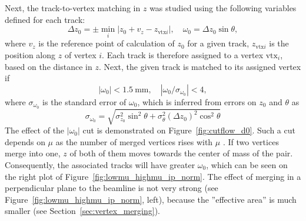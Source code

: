 Next, the track-to-vertex matching in $z$ was studied using the following variables defined for each track:
\begin{equation}
    \Delta z_0 = \pm\min_{i} |z_0 + v_z - z_{\text{vtx}i}|, \quad \omega_0 = \Delta z_0 \sin\theta,
\end{equation}
where $v_z$ is the reference point of calculation of $z_0$ for a given track, $z_{\text{vtx}i}$ is the position along $z$ of vertex $i$.
Each track is therefore assigned to a vertex $\text{vtx}_i$, based on the distance in $z$. Next, the given track is matched to its assigned vertex if 
\begin{equation}
    |\omega_0| < \qty{1.5}{\mm}, \quad |\omega_0/\sigma_{\omega_0}| < 4,
\end{equation}
where $\sigma_{\omega_0}$ is the standard error of $\omega_0$, which is inferred from errors on $z_0$ and $\theta$ as 
\begin{equation}
    \sigma_{\omega_0} = \sqrt{\sigma^2_{z_0}\sin^2\theta + \sigma^2_{\theta}(\Delta z_0)^2\cos^2\theta}
\end{equation}
The effect of the $|\omega_0|$ cut is demonstrated on Figure~\ref{fig:cutflow_d0}. Such a cut depends on $\mu$ as the number of merged vertices rises with $\mu$ \cite{ATLAS:2016nnj}. If two vertices merge into one, $z$ of both of them moves towards the center of mass of the pair. Consequently, the associated tracks will have greater $\omega_0$, which can be seen on the right plot of Figure~\ref{fig:lowmu_highmu_ip_norm}. The effect of merging in a perpendicular plane to the beamline is not very strong (see Figure~\ref{fig:lowmu_highmu_ip_norm}, left), because the ''effective area'' is much smaller (see Section~\ref{sec:vertex_merging}). 
